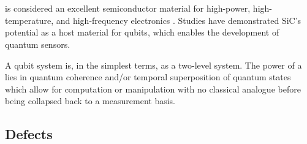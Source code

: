 \section{}\label{SiC}

 is considered an excellent semiconductor material for high-power, high-temperature, and high-frequency electronics \cite{Eddy2009,CASADY19961409}. Studies have demonstrated SiC's potential as a host material for qubits, which enables the development of quantum sensors. 



A qubit system is, in the simplest terms, as a two-level system. The power of a  lies in quantum coherence and/or
temporal superposition of quantum states which allow for computation or manipulation with no classical analogue before being collapsed back to a measurement basis. 



\subsection{Defects}

